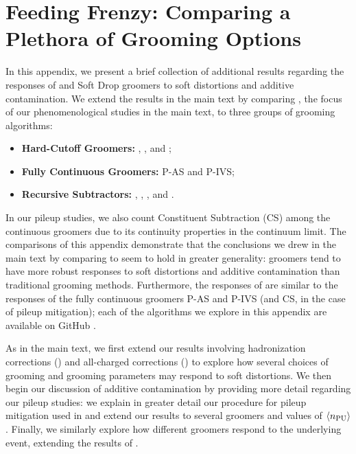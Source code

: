 \documentclass[letterpaper,11pt]{article}
\begin{document}
\section{Feeding Frenzy: Comparing a Plethora of Grooming Options}
\label{app:feedingfrenzy}
In this appendix, we present a brief collection of additional results regarding the responses of \PIRANHA{} and Soft Drop groomers to soft distortions and additive contamination.
%
We extend the results in the main text by comparing , the focus of our phenomenological studies in the main text, to three groups of grooming algorithms:
%
\begin{itemize}
    \item
    \textbf{Hard-Cutoff Groomers:}
    , , and ;

    \item
    \textbf{Fully Continuous Groomers:}
    P-AS and P-IVS;

    \item
    \textbf{Recursive Subtractors:}
    , , , and .
\end{itemize}
In our pileup studies, we also count Constituent Subtraction (CS) \cite{Berta:2014eza} among the continuous groomers due to its continuity properties in the continuum limit.
%
The comparisons of this appendix demonstrate that the conclusions we drew in the main text by comparing  to  seem to hold in greater generality:
%
\PIRANHA{} groomers tend to have more robust responses to soft distortions and additive contamination than traditional grooming methods.
%
Furthermore, the responses of  are similar to the responses of the fully continuous groomers P-AS and P-IVS (and CS, in the case of pileup mitigation);
%
each of the \PIRANHA{} algorithms we explore in this appendix are available on GitHub \cite{piranhagithub}.

As in the main text, we first extend our results involving hadronization corrections () and all-charged corrections () to explore how several choices of grooming and grooming parameters may respond to soft distortions.
%
We then begin our discussion of additive contamination by providing more detail regarding our pileup studies:
%
we explain in greater detail our procedure for pileup mitigation used in  and extend our results to several groomers and values of \(\langle n_{\rm PU}\rangle\).
%
Finally, we similarly explore how different groomers respond to the underlying event, extending the results of .
\end{document}
